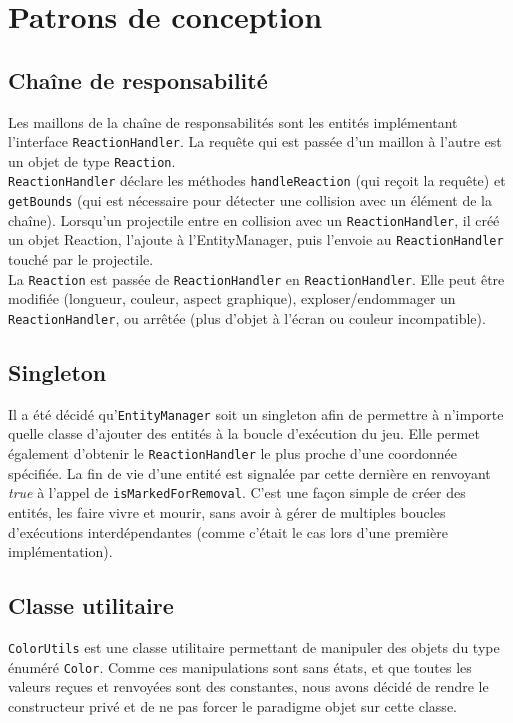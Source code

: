 \documentclass[11pt,a4paper,twoside,svgnames]{article}
\begin{document}
\section{Patrons de conception}
\subsection{Chaîne de responsabilité}
Les maillons de la chaîne de responsabilités sont les entités implémentant l'interface \texttt{ReactionHandler}. La requête qui est passée d'un maillon à l'autre est un objet de type \texttt{Reaction}.\\

\texttt{ReactionHandler} déclare les méthodes \texttt{handleReaction} (qui reçoit la requête) et \texttt{getBounds} (qui est nécessaire pour détecter une collision avec un élément de la chaîne). Lorsqu'un projectile entre en collision avec un \texttt{ReactionHandler}, il créé un objet Reaction, l'ajoute à l'EntityManager, puis l'envoie au \texttt{ReactionHandler} touché par le projectile.\\

La \texttt{Reaction} est passée de \texttt{ReactionHandler} en \texttt{ReactionHandler}. Elle peut être modifiée (longueur, couleur, aspect graphique), exploser/endommager un \texttt{ReactionHandler}, ou arrêtée (plus d'objet à l'écran ou couleur incompatible).

\subsection{Singleton}
Il a été décidé qu'\texttt{EntityManager} soit un singleton afin de permettre à n'importe quelle classe d'ajouter des entités à la boucle d'exécution du jeu. Elle permet également d'obtenir le \texttt{ReactionHandler} le plus proche d'une coordonnée spécifiée. La fin de vie d'une entité est signalée par cette dernière en renvoyant \textit{true} à l'appel de \texttt{isMarkedForRemoval}. C'est une façon simple de créer des entités, les faire vivre et mourir, sans avoir à gérer de multiples boucles d'exécutions interdépendantes (comme c'était le cas lors d'une première implémentation).

\subsection{Classe utilitaire}
\texttt{ColorUtils} est une classe utilitaire permettant de manipuler des objets du type énuméré \texttt{Color}. Comme ces manipulations sont sans états, et que toutes les valeurs reçues et renvoyées sont des constantes, nous avons décidé de rendre le constructeur privé et de ne pas forcer le paradigme objet sur cette classe.\\
\end{document}

